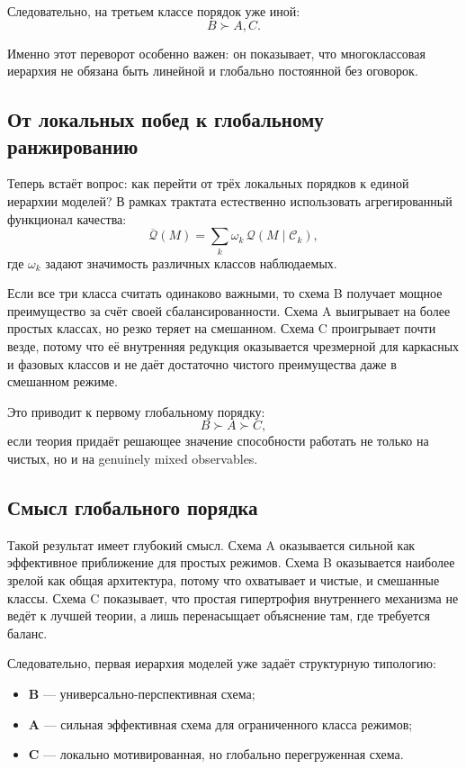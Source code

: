 \documentclass[12pt,a4paper]{article}
\begin{document}
Следовательно, на третьем классе порядок уже иной:
\begin{equation}
B \succ A, C.
\end{equation}

Именно этот переворот особенно важен: он показывает, что многоклассовая иерархия не обязана быть линейной и глобально постоянной без оговорок.

\subsection{От локальных побед к глобальному ранжированию}

Теперь встаёт вопрос: как перейти от трёх локальных порядков к единой иерархии моделей? В рамках трактата естественно использовать агрегированный функционал качества:
\begin{equation}
\overline{\mathcal{Q}}(M) = \sum_{k} \omega_k \, \mathcal{Q}(M\mid \mathcal{C}_k),
\end{equation}
где \(\omega_k\) задают значимость различных классов наблюдаемых.

Если все три класса считать одинаково важными, то схема B получает мощное преимущество за счёт своей сбалансированности. Схема A выигрывает на более простых классах, но резко теряет на смешанном. Схема C проигрывает почти везде, потому что её внутренняя редукция оказывается чрезмерной для каркасных и фазовых классов и не даёт достаточно чистого преимущества даже в смешанном режиме.

Это приводит к первому глобальному порядку:
\begin{equation}
B \succ A \succ C,
\end{equation}
если теория придаёт решающее значение способности работать не только на чистых, но и на genuinely mixed observables.

\subsection{Смысл глобального порядка}

Такой результат имеет глубокий смысл. Схема A оказывается сильной как эффективное приближение для простых режимов. Схема B оказывается наиболее зрелой как общая архитектура, потому что охватывает и чистые, и смешанные классы. Схема C показывает, что простая гипертрофия внутреннего механизма не ведёт к лучшей теории, а лишь перенасыщает объяснение там, где требуется баланс.

Следовательно, первая иерархия моделей уже задаёт структурную типологию:
\begin{itemize}
    \item \textbf{B} --- универсально-перспективная схема;
    \item \textbf{A} --- сильная эффективная схема для ограниченного класса режимов;
    \item \textbf{C} --- локально мотивированная, но глобально перегруженная схема.
\end{itemize}
\end{document}
